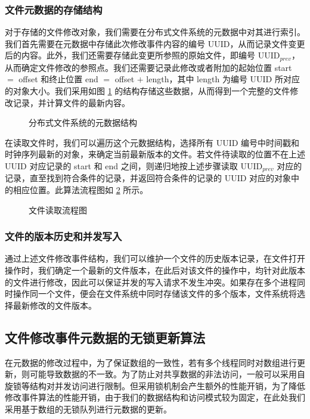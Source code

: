 \subsubsection{文件元数据的存储结构}
对于存储的文件修改对象，我们需要在分布式文件系统的元数据中对其进行索引。我们首先需要在元数据中存储此次修改事件内容的编号 UUID，从而记录文件变更后的内容。此外，我们还需要存储此变更所参照的原始文件，即编号 UUID$_{prev}$，从而确定文件修改的参照点。我们还需要记录此修改或者附加的起始位置 start $=$ offset 和终止位置 end $=$ offset $+$ length，其中 length 为编号 UUID 所对应的对象大小。我们采用如图 \ref{p15} 的结构存储这些数据，从而得到一个完整的文件修改记录，并计算文件的最新内容。

\begin{figure}[!htb]
\centering
\resizebox{.8\textwidth}{!}{}
\caption{分布式文件系统的元数据结构}
\label{p15}
\end{figure}

在读取文件时，我们可以遍历这个元数据结构，选择所有 UUID 编号中时间戳和时钟序列最新的对象，来确定当前最新版本的文件。若文件待读取的位置不在上述 UUID 对应记录的 start 和 end 之间，则递归地按上述步骤读取 UUID$_{prev}$ 对应的记录，直至找到符合条件的记录，并返回符合条件的记录的 UUID 对应的对象中的相应位置。此算法流程图如 \ref{p21} 所示。

\begin{figure}[!htb]
\centering
\resizebox{.8\textwidth}{!}{}
\caption{文件读取流程图}
\label{p21}
\end{figure}
\subsubsection{文件的版本历史和并发写入}
通过上述文件修改事件结构，我们可以维护一个文件的历史版本记录，在文件打开操作时，我们确定一个最新的文件版本，在此后对该文件的操作中，均针对此版本的文件进行修改，因此可以保证并发的写入请求不发生冲突。如果存在多个进程同时操作同一个文件，便会在文件系统中同时存储该文件的多个版本，文件系统将选择最新修改的文件版本。
\subsection{文件修改事件元数据的无锁更新算法}
在元数据的修改过程中，为了保证数组的一致性，若有多个线程同时对数组进行更新，则可能导致数据的不一致。为了防止对共享数据的非法访问，一般可以采用自旋锁等结构对并发访问进行限制。但采用锁机制会产生额外的性能开销，为了降低修改事件算法的性能开销，由于我们的数据结构和访问模式较为固定，在此处我们采用基于数组的无锁队列进行元数据的更新。
